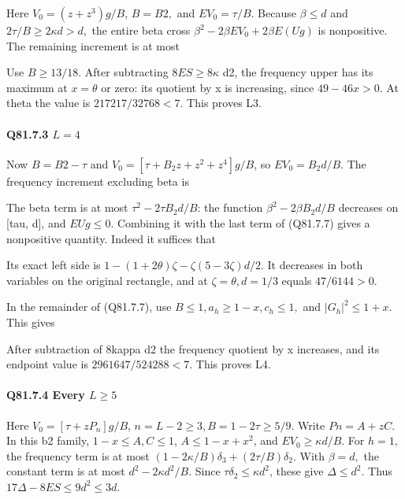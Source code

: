 Here \(V_0=(z+z^3)g/B\), \(B=B2,\allowbreak \) and \(EV_0=\tau/B\).
Because \(\beta\le d\) and \(2\tau/B\ge 2\kappa d>d,\allowbreak \) the entire beta cross
\(\beta^2-2\beta EV_0+2\beta E(Ug)\) is nonpositive.
The remaining increment is at most


Use \(B\ge 13/18.\) After subtracting \(8ES\ge 8\kappa\) d2, the frequency
upper has its maximum at \(x=\theta\) or zero: its quotient by x is
increasing, since \(49-46x>0.\) At theta the value is
\(217217/32768<7\). This proves L3.

\paragraph{Q81.7.3 \(L=4\)}

Now \(B=B2-\tau\) and
\(V_0=[\tau+B_2z+z^2+z^4]g/B\), so \(EV_0=B_2d/B\).
The frequency increment excluding beta is


The beta term is at most \(\tau^2-2\tau B_2d/B\): the function
\(\beta^2-2\beta B_2d/B\) decreases on [tau, d], and \(EUg\le 0.\)
Combining it with the last term of (Q81.7.7) gives a nonpositive quantity.
Indeed it suffices that


Its exact left side is
\(1-(1+2\theta)\zeta-\zeta(5-3\zeta)d/2\).
It decreases in both variables on the original rectangle, and at
\(\zeta=\theta,\allowbreak  d=1/3\) equals \(47/6144>0.\)

In the remainder of (Q81.7.7), use \(B\le 1,\allowbreak  a_h\ge 1-x,\allowbreak  c_h\le 1,\allowbreak \) and \(|G_h|^2\le 1+x.\) This gives


After subtraction of 8kappa d2 the frequency quotient by x increases,
and its endpoint value is \(2961647/524288<7\). This proves L4.

\paragraph{Q81.7.4 Every \(L\ge 5\)}

Here \(V_0=[\tau+zP_n]g/B\), \(n=L-2\ge 3,\allowbreak  B=1-2\tau\ge 5/9.\)
Write \(Pn=A+zC.\) In this b2 family,
\(1-x\le A,\allowbreak  C\le1\), \(A\le1-x+x^2\), and \(EV_0\ge\kappa d/B\).
For \(h=1,\allowbreak \) the frequency term is at most
\((1-2\kappa/B)\delta_3+(2\tau/B)\delta_2\).
With \(\beta=d,\allowbreak \) the constant term is at most \(d^2-2\kappa d^2/B\).
Since \(\tau \delta_2\le\kappa d^2\), these give \(\Delta\le d^2\).
Thus \(17\Delta-8ES\le9d^2\le3d\).

